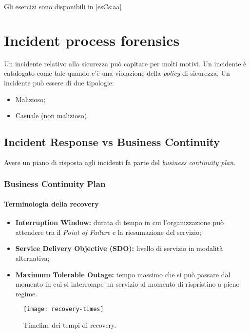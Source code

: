 Gli esercizi sono disponibili in \ref{esCs:aa}

\part{Incident process forensics}

Un incidente relativo alla sicurezza può capitare per molti motivi. Un
incidente è catalogato come tale quando c'è una violazione della
\textit{policy} di sicurezza. Un incidente può essere di due tipologie:
\begin{itemize}
\item Malizioso;
\item Casuale (non malizioso).
\end{itemize}

\chapter{Incident Response vs Business Continuity}
\label{IRBC}

Avere un piano di risposta agli incidenti fa parte del \textit{business
continuity plan}.

\section{Business Continuity Plan}

\subsection{Terminologia della recovery}

\begin{itemize}
\item \textbf{Interruption Window:} durata di tempo in cui l'organizzazione
può attendere tra il \textit{Point of Failure} e la riesumazione del servizio;
\item \textbf{Service Delivery Objective (SDO):} livello di servizio in
modalità alternativa;
\item \textbf{Maximum Tolerable Outage:} tempo massimo che si può passare dal
momento in cui si interrompe un servizio al momento di rispristino a pieno
regime.
\end{itemize}

\begin{figure}
        \begin{center}
                \texttt{[image: recovery-times]}
        \end{center}
        \caption{Timeline dei tempi di recovery.}
        \label{fig:recovery:timeline}
\end{figure}

